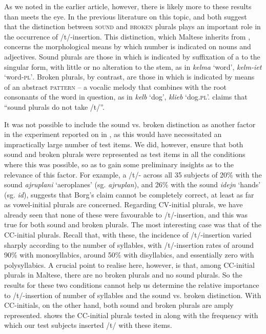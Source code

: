 \documentclass[output=paper]{langsci/langscibook}
\begin{document}
As we noted in the earlier article, however, there is likely more to these results than meets the eye. In the previous literature on this topic, \citet[297]{Borg1974} and \citet[91]{Ambros1998} both suggest that the distinction between \textsc{sound} and \textsc{broken} plurals plays an important role in the occurrence of /t/-insertion. This distinction, which Maltese inherits from , concerns the morphological means by which  number is indicated on nouns and adjectives. Sound plurals are those in which  is indicated by suffixation of a   to the singular form, with little or no alteration to the stem, as in \textit{kelma} ‘word’, \textit{kelm-iet} ‘word-\textsc{pl’}. Broken plurals, by contrast, are those in which  is indicated by means of an abstract \textsc{pattern}  – a vocalic melody that combines with the root consonants of the word in question, as in \textit{kelb} ‘dog’, \textit{klieb} ‘dog.\textsc{pl}’. \citet[297]{Borg1974} claims that “sound plurals do not take /t/”. 

It was not possible to include the sound vs. broken  distinction as another factor in the experiment reported on in \citet{LucasSpagnol2016}, as this would have necessitated an impractically large number of test items. We did, however, ensure that both sound and broken plurals were represented as test items in all the conditions where this was possible, so as to gain some preliminary insights as to the relevance of this factor. For example, a /t/- across all 35 subjects of 20\% with the sound  \textit{ajruplani} ‘aeroplanes’ (sg. \textit{ajruplan}), and 26\% with the sound  \textit{idejn} ‘hands’ (sg. \textit{id}), suggests that Borg’s claim cannot be completely correct, at least as far as vowel-initial plurals are concerned. Regarding CV-initial plurals, we have already seen that none of these were favourable to /t/-insertion, and this was true for both sound and broken plurals. The most interesting case was that of the CC-initial plurals. Recall that, with these, the incidence of /t/-insertion varied sharply according to the number of syllables, with /t/-insertion rates of around 90\% with monosyllabics, around 50\% with disyllabics, and essentially zero with polysyllabics. A crucial point to realise here, however, is that, among CC-initial plurals in Maltese, there are no  broken plurals and no  sound plurals. So the results for these two conditions cannot help us determine the relative importance to /t/-insertion of number of syllables and the sound vs. broken  distinction. With  CC-initials, on the other hand, both sound and broken plurals are amply represented.  shows the CC-initial  plurals tested in \citet{LucasSpagnol2016} along with the frequency with which our test subjects inserted /t/ with these items.
\end{document}
